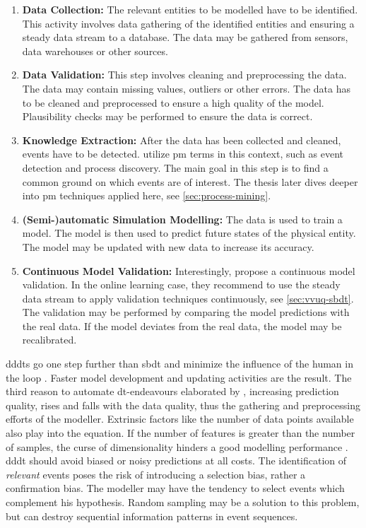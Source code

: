 \begin{enumerate}
  \item \textbf{Data Collection:} The relevant entities to be modelled have to be identified. This activity involves data gathering of the identified entities and ensuring a steady data stream to a database. The data may be gathered from sensors, data warehouses or other sources.
  \item \textbf{Data Validation:} This step involves cleaning and preprocessing the data. The data may contain missing values, outliers or other errors. The data has to be cleaned and preprocessed to ensure a high quality of the model. Plausibility checks may be performed to ensure the data is correct.
  \item \textbf{Knowledge Extraction:} After the data has been collected and cleaned, events have to be detected.  utilize \gls{pm} terms in this context, such as event detection and process discovery. The main goal in this step is to find a common ground on which events are of interest. The thesis later dives deeper into \gls{pm} techniques applied here, see \autoref{sec:process-mining}.
  \item \textbf{(Semi-)automatic Simulation Modelling:} The data is used to train a model. The model is then used to predict future states of the physical entity. The model may be updated with new data to increase its accuracy.
  \item \textbf{Continuous Model Validation:} Interestingly, \citeauthor{francis2021towards} propose a continuous model validation. In the online learning case, they recommend to use the steady data stream to apply validation techniques continuously, see \autoref{sec:vvuq-sbdt}. The validation may be performed by comparing the model predictions with the real data. If the model deviates from the real data, the model may be recalibrated.
\end{enumerate}

\gls{dddt}s go one step further than \gls{sbdt} and minimize the influence of the human in the loop \autocite{francis2021towards,Friederich2022}. Faster model development and updating activities are the result. The third reason to automate \gls{dt}-endeavours elaborated by \textcite{Schwede2024}, increasing prediction quality, rises and falls with the data quality, thus the gathering and preprocessing efforts of the modeller. Extrinsic factors like the number of data points available also play into the equation. If the number of features is greater than the number of samples, the curse of dimensionality hinders a good modelling performance \autocite{koppen2000curse}. \gls{dddt} should avoid biased or noisy predictions at all costs. The identification of \textit{relevant} events poses the risk of introducing a selection bias, rather a confirmation bias. The modeller may have the tendency to select events which complement his hypothesis. Random sampling may be a solution to this problem, but can destroy sequential information patterns in event sequences.


